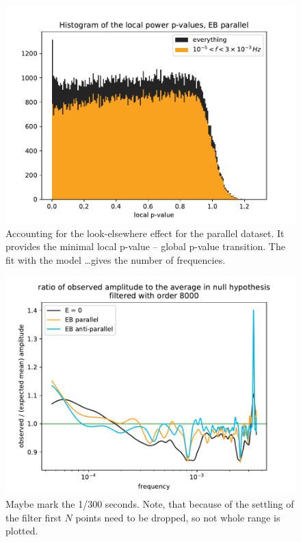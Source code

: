 \begin{figure}
  \centering
  \includegraphics[width=0.9\linewidth]{gfx/axions/P_p-values.pdf}
  \caption{Accounting for the look-elsewhere effect for the parallel dataset. It provides the minimal local p-value -- global p-value transition. The fit with the model \dots gives the number of frequencies. }
  \label{fig:axions_P_p-values}
\end{figure}

\begin{figure}
  \centering
  \includegraphics[width=0.9\linewidth]{gfx/axions/observed-predicted_power_ratio_filtered.pdf}
  \caption{Maybe mark the 1/300 seconds. Note, that because of the settling of the filter first $N$ points need to be dropped, so not whole range is plotted.}
  \label{fig:axions_observed-predicted_power_ratio_filtered}
\end{figure}



